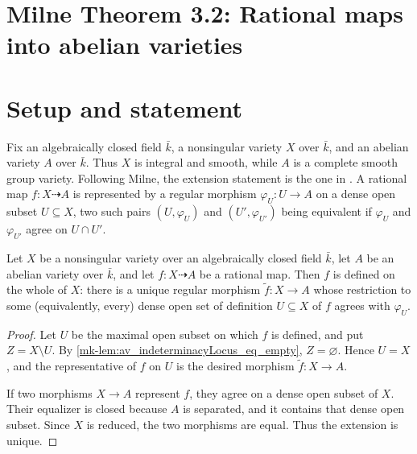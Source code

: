 \section{Milne Theorem 3.2: Rational maps into abelian varieties}
\label{mk-chap:Albanese_Thm32RationalMapExtension}

\section{Setup and statement}
\label{mk-sec:thm32_setup}

Fix an algebraically closed field \(\bar k\), a nonsingular variety \(X\) over
\(\bar k\), and an abelian variety \(A\) over \(\bar k\).  Thus \(X\) is
integral and smooth, while \(A\) is a complete smooth group variety.  Following
Milne, the extension statement is the one in \cite{milne-av}.  A
rational map \(f \colon X \dashrightarrow A\) is represented by a regular
morphism \(\varphi_U \colon U \to A\) on a dense open subset
\(U \subseteq X\), two such pairs \((U, \varphi_U)\) and \((U', \varphi_{U'})\) being equivalent
if \(\varphi_U\) and \(\varphi_{U'}\) agree on \(U \cap U'\).

\begin{theorem}\label{mk-thm:rational_map_to_av_extends}
  \leanok


  Let \(X\) be a nonsingular variety over an algebraically closed field \(\bar k\), let \(A\) be
  an abelian variety over \(\bar k\), and let \(f \colon X \dashrightarrow A\) be a rational
  map. Then \(f\) is defined on the whole of \(X\): there is a unique regular morphism
  \(\widetilde f \colon X \to A\) whose restriction to some (equivalently, every) dense open
  set of definition \(U \subseteq X\) of \(f\) agrees with \(\varphi_U\).
\end{theorem}

\begin{proof}
  Let \(U\) be the maximal open subset on which \(f\) is defined, and put
  \(Z=X\setminus U\).  By \ref{mk-lem:av_indeterminacyLocus_eq_empty},
  \(Z=\varnothing\).  Hence \(U=X\), and the representative of \(f\) on
  \(U\) is the desired morphism \(\widetilde f\colon X\to A\).

  If two morphisms \(X\to A\) represent \(f\), they agree on a dense open
  subset of \(X\).  Their equalizer is closed because \(A\) is separated,
  and it contains that dense open subset.  Since \(X\) is reduced, the two
  morphisms are equal.  Thus the extension is unique.
\end{proof}

